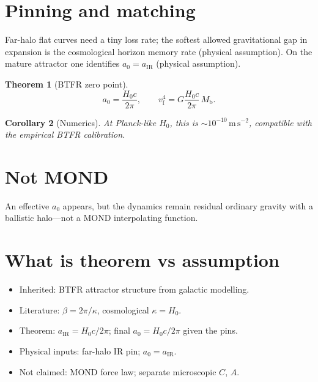 \documentclass[11pt]{article}
\newtheorem{theorem}{Theorem}[section]
\newtheorem{corollary}[theorem]{Corollary}
\theoremstyle{definition}
\theoremstyle{remark}
\newcommand{\Mb}{M_{\mathrm{b}}}
\newcommand{\vf}{v_{\mathrm{f}}}
\begin{document}
\section{Pinning and matching}
Far-halo flat curves need a tiny loss rate; the softest allowed gravitational gap in
expansion is the cosmological horizon memory rate (physical assumption).
On the mature attractor one identifies $a_0=a_{\mathrm{IR}}$ (physical assumption).

\begin{theorem}[BTFR zero point]
\[
  \boxed{a_0=\frac{H_0c}{2\pi},}
  \qquad
  \vf^{4}=G\frac{H_0c}{2\pi}\,\Mb.
\]
\end{theorem}

\begin{corollary}[Numerics]
At Planck-like $H_0$, this is $\sim10^{-10}\,\mathrm{m\,s^{-2}}$, compatible with the
empirical BTFR calibration.
\end{corollary}

\section{Not MOND}
An effective $a_0$ appears, but the dynamics remain residual ordinary gravity with a
ballistic halo---not a MOND interpolating function.

\section{What is theorem vs assumption}
\begin{itemize}
\item Inherited: BTFR attractor structure from galactic modelling.
\item Literature: $\beta=2\pi/\kappa$, cosmological $\kappa=H_0$.
\item Theorem: $a_{\mathrm{IR}}=H_0c/2\pi$; final $a_0=H_0c/2\pi$ given the pins.
\item Physical inputs: far-halo IR pin; $a_0=a_{\mathrm{IR}}$.
\item Not claimed: MOND force law; separate microscopic $C$, $A$.
\end{itemize}
\end{document}
